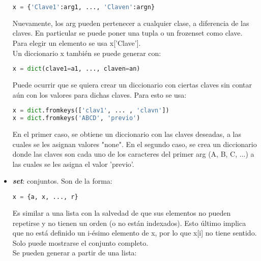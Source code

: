 \documentclass[10pt,oneside]{article}
\begin{document}
\begin{multicols}{2}
\begin{itemize}
                \begin{lstlisting}[language=Python]
x = {'Clave1':arg1, ..., 'Claven':argn}   
                \end{lstlisting}
                
                Nuevamente, los arg pueden pertenecer a cualquier clase, a diferencia de las claves. En particular se puede poner una tupla o un frozenset como clave. Para elegir un elemento se usa x['Clave']. \\ \newline Un diccionario x también se puede generar con:

                \begin{lstlisting}[language=Python]
x = dict(clave1=a1, ..., claven=an)                   
                \end{lstlisting}

                Puede ocurrir que se quiera crear un diccionario con ciertas claves sin contar aún con los valores para dichas claves. Para esto se usa:

                \begin{lstlisting}[language=Python]
x = dict.fromkeys(['clav1', ... , 'clavn'])  
x = dict.fromkeys('ABCD', 'previo')  
                \end{lstlisting}

                En el primer caso, se obtiene un diccionario con las claves deseadas, a las cuales se les asignan valores "none". En el segundo caso, se crea un diccionario donde las claves son cada uno de los caracteres del primer arg (A, B, C, ...) a las cuales se les asigna el valor 'previo'.
                
                
                \item \textbf{\textit{set}}: conjuntos. Son de la forma:

                \begin{lstlisting}[language=Python]
x = {a, x, ..., r}   
                \end{lstlisting}

                Es similar a una lista con la salvedad de que sus elementos no pueden repetirse y no tienen un orden (o no están indexados). Esto último implica que no está definido un i-ésimo elemento de x, por lo que x[i] no tiene sentido. Solo puede mostrarse el conjunto completo.\\ \newline Se pueden generar a partir de una lista:


\end{itemize}
\end{multicols}
\end{document}

